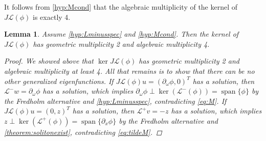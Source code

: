 \documentclass[12pt]{elsarticle}
\def\calL{{\mathcal L}}
\DeclareMathOperator{\spn}{span}
\newtheorem{lemma}{Lemma}
\begin{document}
It follows from \cref{hyp:Mcond} that the algebraic multiplicity of the kernel of $J \calL(\phi)$ is exactly 4.
\begin{lemma}\label{lemma:kernelL}
Assume \cref{hyp:Lminusspec} and \cref{hyp:Mcond}. Then the kernel of $J \calL(\phi)$ has geometric multiplicity 2 and algebraic multiplicity 4.
\begin{proof}
We showed above that $\ker J \calL(\phi)$ has geometric multiplicity 2 and algebraic multiplicity at least 4. All that remains is to show that there can be no other generalized eigenfunctions. If $J \calL(\phi) u = (\partial_\omega \phi, 0)^T$ has a solution, then $\calL^- w = \partial_\omega \phi$ has a solution, which implies $\partial_\omega \phi \perp \ker(\calL^-(\phi)) = \spn\{\phi\}$ by the Fredholm alternative and \cref{hyp:Lminusspec}, contradicting \cref{eq:M}. If $J \calL(\phi) u = (0, z)^T$ has a solution, then $\calL^+ v = -z$ has a solution, which implies $z \perp \ker(\calL^+(\phi)) = \spn\{\partial_x \phi\}$ by the Fredholm alternative and \cref{theorem:solitonexist}, contradicting \cref{eq:tildeM}.
\end{proof}
\end{lemma}
\end{document}
